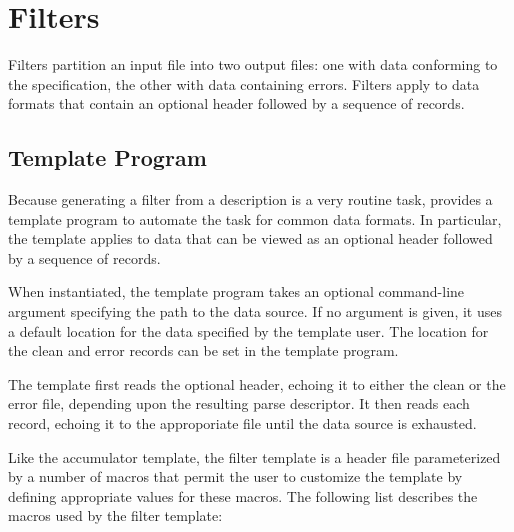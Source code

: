 \chapter{Filters}
\label{chap:filter}
Filters partition an input file into two output files: one with data
conforming to the specification, the other with data containing
errors.  Filters apply to data formats that contain an optional header
followed by a sequence of records.  


\section{Template Program}
Because generating a filter from a \pads{} description is
a very routine task, \pads{} provides a template program to automate
the task for common data formats.  In particular, the template applies
to data that can be viewed as an optional header followed by a
sequence of records.  

When instantiated, the template program takes an optional command-line
argument specifying the path to the data source. If no argument is
given, it uses a default location for the data specified by the
template user.  The location for the clean and error records can be
set in the template program.

The template first reads the optional header, echoing it to either the
clean or the error file, depending upon the resulting parse
descriptor. It then reads each record, echoing it to the approporiate
file until the data source is exhausted.

Like the accumulator template, the filter template is a \C{} header
file parameterized by a number of macros that permit the user to customize
the template by defining appropriate values for these macros.  
The following list describes the macros used by the
filter template:

